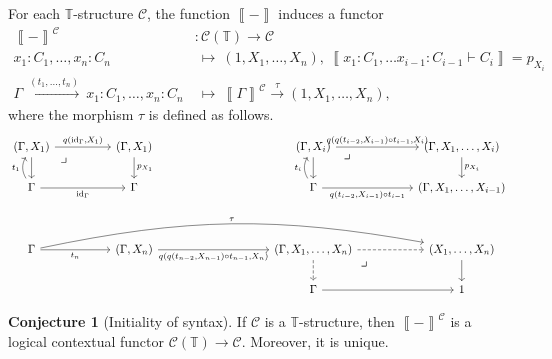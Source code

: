 \documentclass[10pt,letterpaper,cm]{nupset}
\theoremstyle{definition}
\theoremstyle{theorem}
\newtheorem{conj}[definition]{Conjecture}
\theoremstyle{remark}
\newcommand{\0}{\mathbf{0}}
\newcommand{\1}{\mathbf{1}}
\newcommand{\2}{\mathbf{2}}
\renewcommand{\c}{\mathscr{C}}
\newcommand{\T}{\mathbb T}
\DeclareMathOperator{\idd}{id}
\begin{document}
For each $\T$-structure $\c$, the function $\left\llbracket{-}\right\rrbracket$ induces a functor 
\begin{align*}
\left\llbracket{-}\right\rrbracket^{\c} & : \c(\T) \to \c
\\ x_1 : C_1, \ldots, x_n : C_n  & \ \mapsto \ \left(1, X_1, \ldots, X_n\right), \ \left\llbracket{x_1 : C_1, \ldots x_{i-1} : C_{i-1} \vdash C_i}\right\rrbracket = p_{X_i} 
\\ \Gamma \  \xrightarrow{\left(t_1, \ldots, t_n\right)} \  x_1 : C_1, \ldots, x_n : C_n  & \ \mapsto \  \left\llbracket{\Gamma}\right\rrbracket^{\c} \xrightarrow{\tau}  \left(1, X_1, \ldots, X_n\right),
\end{align*} where the morphism $\tau$ is defined as follows.
\[
\begin{tikzcd}[column sep = huge]
	{\left(\Gamma, X_1\right)} & {\left(\Gamma, X_1\right)} && {\left(\Gamma, X_i\right)} & {\left(\Gamma, X_1, \ldots, X_i\right)} \\
	\Gamma & \Gamma && \Gamma & {\left(\Gamma, X_1, \ldots, X_{i-1}\right)} \\
	\\
	\Gamma & {\left(\Gamma, X_n\right)} && {\left(\Gamma, X_1, \ldots, X_n\right)} & {\left(X_1, \ldots, X_n\right)} \\
	&&& \Gamma & 1
	\arrow["{p_{X_1}}", from=1-2, to=2-2]
	\arrow["{\idd_{\Gamma}}"', from=2-1, to=2-2]
	\arrow[from=1-1, to=2-1]
	\arrow["{q(\idd_{\Gamma},X_1)}", from=1-1, to=1-2]
	\arrow["\scalebox{1.5}{\color{black}$\lrcorner$}"{anchor=center, pos=0.125}, draw=none, from=1-1, to=2-2]
	\arrow["{t_1}", bend left, from=2-1, to=1-1]
	\arrow[from=1-4, to=2-4]
	\arrow["{p_{X_i}}", from=1-5, to=2-5]
	\arrow["{q(t_{i-2}, X_{i-1}) \circ t_{i-1}}"', from=2-4, to=2-5]
	\arrow["{q( q(t_{i-2}, X_{i-1}) \circ t_{i-1} , X_i)}", from=1-4, to=1-5]
	\arrow["{t_i}", bend left, from=2-4, to=1-4]
	\arrow["\scalebox{1.5}{\color{black}$\lrcorner$}"{anchor=center, pos=0.125}, draw=none, from=1-4, to=2-5]
	\arrow[dashed, from=4-4, to=4-5]
	\arrow[from=4-5, to=5-5]
	\arrow[from=5-4, to=5-5]
	\arrow[dashed, from=4-4, to=5-4]
	\arrow["\scalebox{1.5}{\color{black}$\lrcorner$}"{anchor=center, pos=0.125}, draw=none, from=4-4, to=5-5]
	\arrow["{t_n}"', from=4-1, to=4-2]
	\arrow["{q( q(t_{n-2}, X_{n-1}) \circ t_{n-1} , X_n)}"', from=4-2, to=4-4]
	\arrow["\tau", bend left=11, from=4-1, to=4-5]
\end{tikzcd}
\]

\begin{conj}[Initiality of syntax]\label{initial}
If $\c$ is a $\T$-structure, then $\left\llbracket{-}\right\rrbracket^{\c}$ is a logical contextual functor $\c(\T) \to \c$. Moreover, it is unique.
\end{conj}
\end{document}
